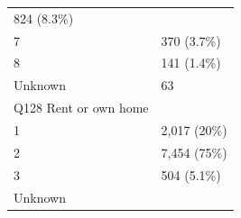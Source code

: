 \documentclass[]{article}
\begin{document}
\begin{longtable}[]{@{}ll@{}}
\begin{minipage}[t]{0.23\columnwidth}
824 (8.3\%)\strut
\end{minipage}\tabularnewline
\begin{minipage}[t]{0.71\columnwidth}\raggedright
7\strut
\end{minipage} & \begin{minipage}[t]{0.23\columnwidth}\raggedright
370 (3.7\%)\strut
\end{minipage}\tabularnewline
\begin{minipage}[t]{0.71\columnwidth}\raggedright
8\strut
\end{minipage} & \begin{minipage}[t]{0.23\columnwidth}\raggedright
141 (1.4\%)\strut
\end{minipage}\tabularnewline
\begin{minipage}[t]{0.71\columnwidth}\raggedright
Unknown\strut
\end{minipage} & \begin{minipage}[t]{0.23\columnwidth}\raggedright
63\strut
\end{minipage}\tabularnewline
\begin{minipage}[t]{0.71\columnwidth}\raggedright
Q128 Rent or own home\strut
\end{minipage} & \begin{minipage}[t]{0.23\columnwidth}\raggedright
\strut
\end{minipage}\tabularnewline
\begin{minipage}[t]{0.71\columnwidth}\raggedright
1\strut
\end{minipage} & \begin{minipage}[t]{0.23\columnwidth}\raggedright
2,017 (20\%)\strut
\end{minipage}\tabularnewline
\begin{minipage}[t]{0.71\columnwidth}\raggedright
2\strut
\end{minipage} & \begin{minipage}[t]{0.23\columnwidth}\raggedright
7,454 (75\%)\strut
\end{minipage}\tabularnewline
\begin{minipage}[t]{0.71\columnwidth}\raggedright
3\strut
\end{minipage} & \begin{minipage}[t]{0.23\columnwidth}\raggedright
504 (5.1\%)\strut
\end{minipage}\tabularnewline
\begin{minipage}[t]{0.71\columnwidth}\raggedright
Unknown\strut
\end{minipage} & \begin{minipage}[t]{0.23\columnwidth}\raggedright

\end{minipage}
\end{longtable}
\end{document}
